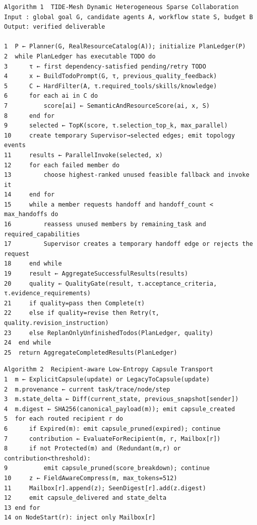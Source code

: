 \documentclass[UTF8,a4paper,12pt]{ctexart}
\begin{document}
\begin{verbatim}
Algorithm 1  TIDE-Mesh Dynamic Heterogeneous Sparse Collaboration
Input : global goal G, candidate agents A, workflow state S, budget B
Output: verified deliverable

1  P ← Planner(G, RealResourceCatalog(A)); initialize PlanLedger(P)
2  while PlanLedger has executable TODO do
3      τ ← first dependency-satisfied pending/retry TODO
4      x ← BuildTodoPrompt(G, τ, previous_quality_feedback)
5      C ← HardFilter(A, τ.required_tools/skills/knowledge)
6      for each ai in C do
7          score[ai] ← SemanticAndResourceScore(ai, x, S)
8      end for
9      selected ← TopK(score, τ.selection_top_k, max_parallel)
10     create temporary Supervisor→selected edges; emit topology events
11     results ← ParallelInvoke(selected, x)
12     for each failed member do
13         choose highest-ranked unused feasible fallback and invoke it
14     end for
15     while a member requests handoff and handoff_count < max_handoffs do
16         reassess unused members by remaining_task and required_capabilities
17         Supervisor creates a temporary handoff edge or rejects the request
18     end while
19     result ← AggregateSuccessfulResults(results)
20     quality ← QualityGate(result, τ.acceptance_criteria, τ.evidence_requirements)
21     if quality=pass then Complete(τ)
22     else if quality=revise then Retry(τ, quality.revision_instruction)
23     else ReplanOnlyUnfinishedTodos(PlanLedger, quality)
24  end while
25  return AggregateCompletedResults(PlanLedger)
\end{verbatim}

\begin{verbatim}
Algorithm 2  Recipient-aware Low-Entropy Capsule Transport
1  m ← ExplicitCapsule(update) or LegacyToCapsule(update)
2  m.provenance ← current task/trace/node/step
3  m.state_delta ← Diff(current_state, previous_snapshot[sender])
4  m.digest ← SHA256(canonical_payload(m)); emit capsule_created
5  for each routed recipient r do
6      if Expired(m): emit capsule_pruned(expired); continue
7      contribution ← EvaluateForRecipient(m, r, Mailbox[r])
8      if not Protected(m) and (Redundant(m,r) or contribution<threshold):
9          emit capsule_pruned(score_breakdown); continue
10     z ← FieldAwareCompress(m, max_tokens=512)
11     Mailbox[r].append(z); SeenDigest[r].add(z.digest)
12     emit capsule_delivered and state_delta
13 end for
14 on NodeStart(r): inject only Mailbox[r]
\end{verbatim}
\end{document}
